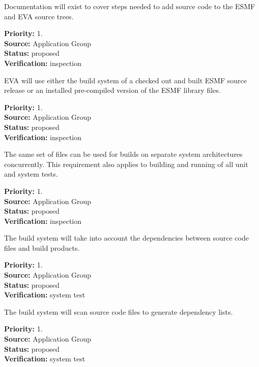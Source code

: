 Documentation will exist to cover steps needed to add source
code to the ESMF and EVA source trees.
\begin{reqlist}
{\bf Priority:} 1. \\
{\bf Source:} Application Group \\
{\bf Status:} proposed \\
{\bf Verification:} inspection
\end{reqlist}

EVA will use either the build system
of a checked out and built  ESMF source release or 
an installed pre-compiled version of the ESMF library files.
\begin{reqlist}
{\bf Priority:} 1. \\
{\bf Source:} Application Group \\
{\bf Status:} proposed \\
{\bf Verification:} inspection
\end{reqlist}


The same set of files can be used for builds on separate 
system architectures concurrently.  This requirement also
applies to building and running of all unit and system
tests.
\begin{reqlist}
{\bf Priority:} 1. \\
{\bf Source:} Application Group \\
{\bf Status:} proposed \\
{\bf Verification:} inspection
\end{reqlist}

The build system will take into account the dependencies 
between source code files and build products.  
\begin{reqlist}
{\bf Priority:} 1. \\
{\bf Source:} Application Group \\
{\bf Status:} proposed \\
{\bf Verification:} system test
\end{reqlist}

The build system will scan source code files to 
generate dependency lists.
\begin{reqlist}
{\bf Priority:} 1. \\
{\bf Source:} Application Group \\
{\bf Status:} proposed \\
{\bf Verification:} system test
\end{reqlist}

